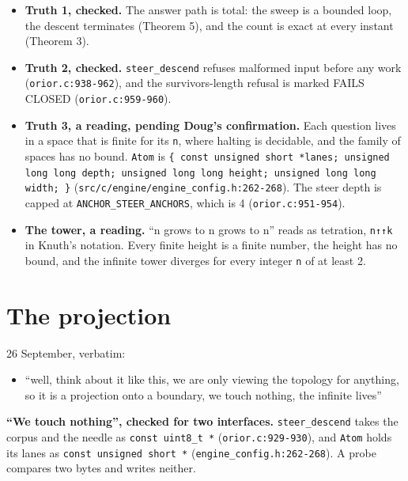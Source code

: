 \begin{itemize}
\item \textbf{Truth 1, checked.} The answer path is total: the sweep is a bounded loop, the descent terminates (Theorem 5), and the count is exact at every instant (Theorem 3).
\item \textbf{Truth 2, checked.} \texttt{steer\_\allowbreak{}descend} refuses malformed input before any work (\texttt{orior.\allowbreak{}c:938-\allowbreak{}962}), and the survivors-length refusal is marked FAILS CLOSED (\texttt{orior.\allowbreak{}c:959-\allowbreak{}960}).
\item \textbf{Truth 3, a reading, pending Doug's confirmation.} Each question lives in a space that is finite for its \texttt{n}, where halting is decidable, and the family of spaces has no bound. \texttt{Atom} is \texttt{\{ const unsigned short *lanes; unsigned long long depth; unsigned long long height; unsigned long long width; \}} (\texttt{src/\allowbreak{}c/\allowbreak{}engine/\allowbreak{}engine\_\allowbreak{}config.\allowbreak{}h:262-\allowbreak{}268}). The steer depth is capped at \texttt{ANCHOR\_\allowbreak{}STEER\_\allowbreak{}ANCHORS}, which is 4 (\texttt{orior.\allowbreak{}c:951-\allowbreak{}954}).
\item \textbf{The tower, a reading.} “n grows to n grows to n” reads as tetration, \texttt{n↑↑k} in Knuth's notation. Every finite height is a finite number, the height has no bound, and the infinite tower diverges for every integer \texttt{n} of at least 2.
\end{itemize}

\section{\texorpdfstring{The projection}{The projection}}

26 September, verbatim:

\begin{itemize}
\item “well, think about it like this, we are only viewing the topology for anything, so it is a projection onto a boundary, we touch nothing, the infinite lives”
\end{itemize}

\textbf{“We touch nothing”, checked for two interfaces.} \texttt{steer\_\allowbreak{}descend} takes the corpus and the needle as \texttt{const uint8\_\allowbreak{}t *} (\texttt{orior.\allowbreak{}c:929-\allowbreak{}930}), and \texttt{Atom} holds its lanes as \texttt{const unsigned short *} (\texttt{engine\_\allowbreak{}config.\allowbreak{}h:262-\allowbreak{}268}). A probe compares two bytes and writes neither.

